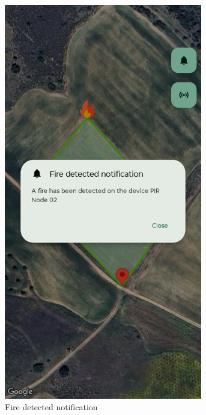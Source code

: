 \begin{enumerate}
\begin{figure}[H]
            \begin{subfigure}[t]{0.3\textwidth}
                \centering
                \includegraphics[width=0.95\textwidth]{images/8/11.png}
                \caption{Fire detected notification}
            \end{subfigure}
            \begin{subfigure}[t]{0.3\textwidth}

\end{subfigure}
\end{figure}
\end{enumerate}
